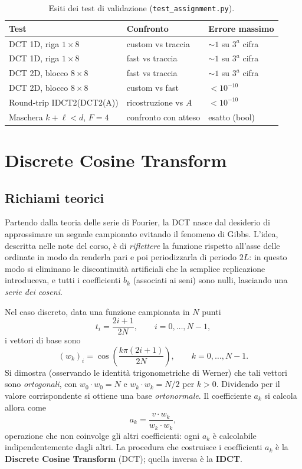 \documentclass[11pt,a4paper]{article}
\begin{document}
\begin{table}[H]
\centering
\caption{Esiti dei test di validazione (\texttt{test\_assignment.py}).}
\label{tab:validazione}
\begin{tabular}{lll}
\toprule
Test & Confronto & Errore massimo \\
\midrule
DCT 1D, riga $1\times 8$  & custom vs traccia      & $\sim 1$ su $3^a$ cifra \\
DCT 1D, riga $1\times 8$  & fast vs traccia        & $\sim 1$ su $3^a$ cifra \\
DCT 2D, blocco $8\times 8$& fast vs traccia        & $\sim 1$ su $3^a$ cifra \\
DCT 2D, blocco $8\times 8$& custom vs fast         & $<10^{-10}$ \\
Round-trip IDCT2(DCT2(A)) & ricostruzione vs $A$   & $<10^{-10}$ \\
Maschera $k+\ell<d$, $F=4$& confronto con atteso   & esatto (bool) \\
\bottomrule
\end{tabular}
\end{table}

\section{Discrete Cosine Transform}\label{sec:dct}

\subsection{Richiami teorici}

Partendo dalla teoria delle serie di Fourier, la DCT nasce dal desiderio di
approssimare un segnale campionato evitando il fenomeno di Gibbs. L'idea,
descritta nelle note del corso, è di \emph{riflettere} la funzione rispetto
all'asse delle ordinate in modo da renderla pari e poi periodizzarla di periodo
$2L$: in questo modo si eliminano le discontinuità artificiali che la semplice
replicazione introduceva, e tutti i coefficienti $b_k$ (associati ai seni)
sono nulli, lasciando una \emph{serie dei coseni}.

Nel caso discreto, data una funzione campionata in $N$ punti
\[
t_i = \frac{2i+1}{2N}, \qquad i=0,\dots,N-1,
\]
i vettori di base sono
\[
(w_k)_i = \cos\!\left(\frac{k\pi(2i+1)}{2N}\right), \qquad k=0,\dots,N-1.
\]
Si dimostra (osservando le identità trigonometriche di Werner) che tali
vettori sono \emph{ortogonali}, con $w_0\!\cdot\! w_0 = N$ e
$w_k\!\cdot\! w_k = N/2$ per $k>0$. Dividendo per il valore corrispondente si
ottiene una base \emph{ortonormale}. Il coefficiente $a_k$ si calcola allora
come
\[
a_k = \frac{v\cdot w_k}{w_k\cdot w_k},
\]
operazione che non coinvolge gli altri coefficienti: ogni $a_k$ è calcolabile
indipendentemente dagli altri. La procedura che costruisce i coefficienti $a_k$
è la \textbf{Discrete Cosine Transform} (DCT); quella inversa è la
\textbf{IDCT}.
\end{document}
